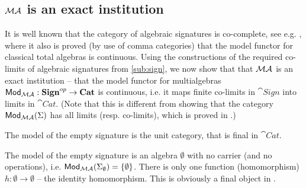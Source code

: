 \subsection{${\mathcal{MA}}$ is an exact institution}
\label{se:exact}
It is well known that the category of algebraic signatures is co-complete,
see e.g. \cite{fundamental1}, where it also is proved (by use of comma
categories) that the model functor for classical total algebras is
continuous. 
Using the constructions of the required
co-limits of algebraic signatures from \ref{sub:sign}, we now show that
that ${\mathcal{MA}}$ is an exact institution -- that
 the model functor for multialgebras
${\sf {Mod_{{\mathcal{MA}}}}}:{\bf Sign}^{op} \to {\bf Cat}$ is continuous, i.e. it
maps finite co-limits in $\cat{Sign}$ into limits in $\cat{Cat}$. (Note that this
is different from showing that the category ${\sf {Mod}}_{{\mathcal{MA}}}(\Sigma)$ has all
limits (resp. co-limits), which is proved in \cite{catrel}.)
%
\begin{lemma}
\label{le:initialtofinal}
The model of the empty signature is the unit category, that is final in $\cat{Cat}$.
\end{lemma}
\begin{PROOF}
The model of the empty signature is an algebra $\emptyset$ with no carrier (and no
operations), i.e. ${\sf {Mod}}_{{\mathcal{MA}}}(\Sigma_{\emptyset}) = \{ \emptyset \}$.
There is only one function (homomorphism) $h: \emptyset \to \emptyset$ -- the identity
homomorphism. This is obviously a final object in .
\end{PROOF}


